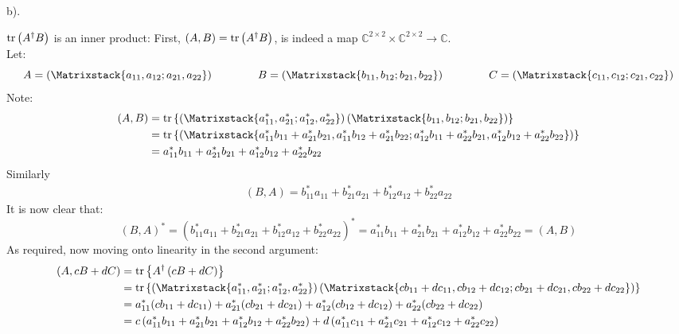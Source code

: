 \documentclass[a4paper,12pt]{article}
\newcommand\rbm[1]{\left(\Matrixstack{#1}\right)}
\begin{document}
\begin{minipage}[t]{\textwidth}
  b).
  \begin{minipage}[t]{\textwidth}
    $\trace\left({A^\dagger B}\right)$ is an inner product:
    First, $\left(A, B\right) = \trace\left(A^\dagger B\right)$, is indeed a map $\mathbb{C}^{2\times 2}\times \mathbb{C}^{2\times 2} \to \mathbb{C}$.\\
    Let:
    \begin{equation*}
      A = \rbm{a_{11}, a_{12}; a_{21}, a_{22}} \qquad \qquad B = \rbm{b_{11}, b_{12}; b_{21}, b_{22}} \qquad  \qquad C = \rbm{c_{11}, c_{12}; c_{21}, c_{22}}
    \end{equation*}
    Note:
    \begin{align*}
      \left( A, B \right) &= \trace\left\{\rbm{a_{11}^*, a_{21}^*; a_{12}^*, a_{22}^*} \rbm{b_{11}, b_{12}; b_{21}, b_{22}}\right\}\\
      & = \trace\left\{\rbm{a_{11}^*b_{11} + a_{21}^* b_{21}, a_{11}^*b_{12} + a_{21}^*b_{22}; a_{12}^*b_{11} + a_{22}^*b_{21}, a_{12}^*b_{12} + a_{22}^* b_{22}} \right\} \\
      &= a_{11}^*b_{11} + a_{21}^* b_{21} + a_{12}^*b_{12} + a_{22}^* b_{22}
    \end{align*}
    Similarly
    \begin{align*}
      \left(B, A \right) = b_{11}^*a_{11} + b_{21}^* a_{21} + b_{12}^*a_{12} + b_{22}^* a_{22}
    \end{align*}
    It is now clear that:
    \begin{equation*}
      \left( B, A \right)^* = \left(b_{11}^*a_{11} + b_{21}^* a_{21} + b_{12}^*a_{12} + b_{22}^* a_{22}\right)^* = a_{11}^*b_{11} + a_{21}^* b_{21} + a_{12}^*b_{12} + a_{22}^* b_{22} = \left( A, B\right)
    \end{equation*}
    As required, now moving onto linearity in the second argument:
    \begin{align*}
      \left(A , cB + dC \right) &= \trace\left\{A^\dagger\left(cB + dC\right)\right\}\\
                    &= \trace\left\{\rbm{a_{11}^*, a_{21}^*; a_{12}^*, a_{22}^*} \rbm{cb_{11} + dc_{11}, cb_{12} + d c_{12}; cb_{21}+ d c_{21}, cb_{22}+ d c_{22}}\right\}\\
                    &= a_{11}^*(cb_{11} + dc_{11}) + a_{21}^* (cb_{21} + dc_{21}) + a_{12}^*(cb_{12} + dc_{12}) + a_{22}^* (cb_{22}+ dc_{22})\\
                    &= c\left(a_{11}^*b_{11} + a_{21}^* b_{21} + a_{12}^*b_{12} + a_{22}^*b_{22} \right)+ d\left(a_{11}^*c_{11}  + a_{21}^* c_{21}  + a_{12}^*c_{12} + a_{22}^*c_{22}\right)\\

\end{align*}
\end{minipage}
\end{minipage}
\end{document}
